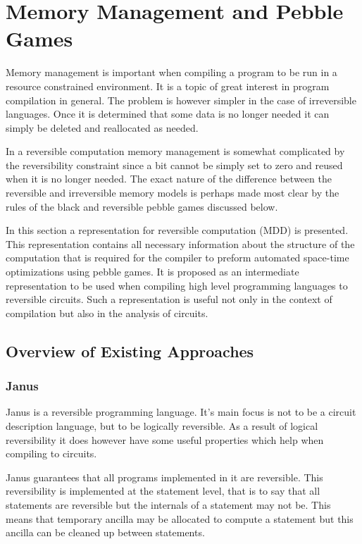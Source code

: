 \chapter{Memory Management and Pebble Games}

Memory management is important when compiling a program to be run in a resource
constrained environment. It is a topic of great interest in program compilation
in general. The problem is however simpler in the case of irreversible
languages. Once it is determined that some data is no longer needed it can
simply be deleted and reallocated as needed.

In a reversible computation memory management is somewhat complicated by the
reversibility constraint since a bit cannot be simply set to zero and reused
when it is no longer needed. The exact nature of the difference between the
reversible and irreversible memory models is perhaps made most clear by the
rules of the black and reversible pebble games discussed below.

In this section a representation for reversible computation (MDD) is presented.
This representation contains all necessary information about the structure of
the computation that is required for the compiler to preform automated
space-time optimizations using pebble games. It is proposed as an
intermediate representation to be used when compiling high level programming
languages to reversible circuits. 
Such a representation is useful not only in the context of compilation but also in the analysis of circuits.

\section{Overview of Existing Approaches}

\subsection{Janus} 

Janus\cite{YG:2007,LD:1982} is a reversible programming language.  It's main
focus is not to be a circuit description language, but to be logically
reversible. As a result of logical reversibility it does however have some
useful properties which help when compiling to circuits.

Janus guarantees that all programs implemented in it are reversible.
This reversibility is implemented at the statement level, that is to say that
all statements are reversible but the internals of a statement may not be.
This means that temporary ancilla may be allocated to compute a statement but
this ancilla can be cleaned up between statements.

